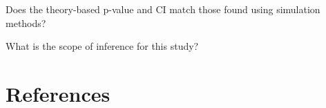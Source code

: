 \documentclass[
]{report}
\newcommand{\rgi}{\hspace{24pt}}  %
\begin{document}
\rgi Does the theory-based p-value and CI match those found using simulation methods?

\vspace{0.8in}

\rgi What is the scope of inference for this study?

\vspace{0.8in}

\newpage



\hypertarget{references}{%
\chapter*{References}\label{references}}

\hypertarget{refs}{}
\end{document}
